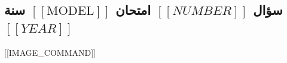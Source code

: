 \filbreak
\subsection*{\texorpdfstring{سؤال $[[NUMBER]]$ امتحان $\mathrm{[[MODEL]]}$ سنة $[[YEAR]]$}{سؤال [[NUMBER]] امتحان [[MODEL]] سنة [[YEAR]]}}
{}

[[IMAGE_COMMAND]]


\filbreak
